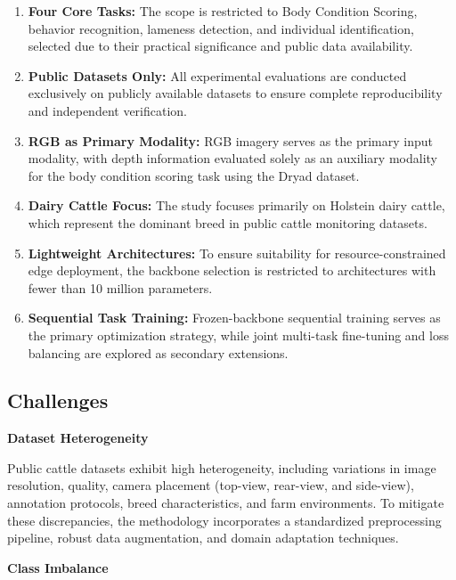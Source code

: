 \begin{enumerate}
    \item \textbf{Four Core Tasks:} The scope is restricted to Body Condition Scoring, behavior recognition, lameness detection, and individual identification, selected due to their practical significance and public data availability.
    
    \item \textbf{Public Datasets Only:} All experimental evaluations are conducted exclusively on publicly available datasets to ensure complete reproducibility and independent verification.
    
    \item \textbf{RGB as Primary Modality:} RGB imagery serves as the primary input modality, with depth information evaluated solely as an auxiliary modality for the body condition scoring task using the Dryad dataset.
    
    \item \textbf{Dairy Cattle Focus:} The study focuses primarily on Holstein dairy cattle, which represent the dominant breed in public cattle monitoring datasets.
    
    \item \textbf{Lightweight Architectures:} To ensure suitability for resource-constrained edge deployment, the backbone selection is restricted to architectures with fewer than 10 million parameters.
    
    \item \textbf{Sequential Task Training:} Frozen-backbone sequential training serves as the primary optimization strategy, while joint multi-task fine-tuning and loss balancing are explored as secondary extensions.
\end{enumerate}


\subsection{Challenges}

\textbf{Dataset Heterogeneity}

Public cattle datasets exhibit high heterogeneity, including variations in image resolution, quality, camera placement (top-view, rear-view, and side-view), annotation protocols, breed characteristics, and farm environments. To mitigate these discrepancies, the methodology incorporates a standardized preprocessing pipeline, robust data augmentation, and domain adaptation techniques.


\textbf{Class Imbalance}

